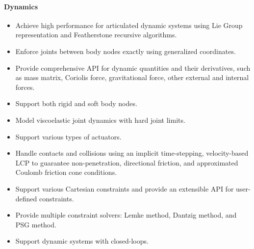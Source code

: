 \paragraph{Dynamics}
\begin{itemize}[leftmargin=*] \itemsep1pt \parskip0pt 
  \item Achieve high performance for articulated dynamic systems using Lie Group representation and Featherstone recursive algorithms.
  \item Enforce joints between body nodes exactly using generalized coordinates.
  \item Provide comprehensive API for dynamic quantities and their derivatives, such as mass matrix, Coriolis force, gravitational force, other external and internal forces.
  \item Support both rigid and soft body nodes.
  \item Model viscoelastic joint dynamics with hard joint limits.
  \item Support various types of actuators.
  \item Handle contacts and collisions using an implicit time-stepping, velocity-based LCP to guarantee non-penetration, directional friction, and approximated Coulomb friction cone conditions.
  \item Support various Cartesian constraints and provide an extensible API for user-defined constraints.
  \item Provide multiple constraint solvers: Lemke method, Dantzig method, and PSG method.
  \item Support dynamic systems with closed-loops.
\end{itemize}



